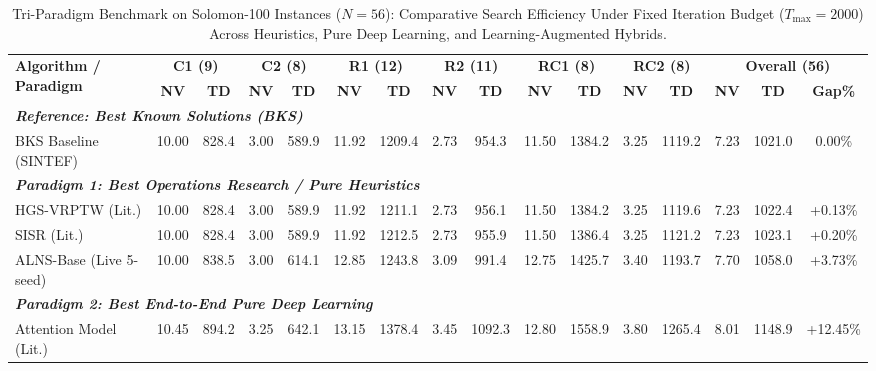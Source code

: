 \documentclass{ieeeaccess}
\begin{document}
\begin{table}[!t]
\caption{Tri-Paradigm Benchmark on Solomon-100 Instances ($N=56$): Comparative Search Efficiency Under Fixed Iteration Budget ($T_{\max}=2000$) Across Heuristics, Pure Deep Learning, and Learning-Augmented Hybrids.}
\label{tab:solomon_tri_paradigm}
\centering
\footnotesize
\setlength{\tabcolsep}{1.7pt}
\begin{tabular*}{\textwidth}{@{\extracolsep{\fill}} l cc cc cc cc cc cc ccc @{}}
\toprule
\multirow{2}{*}{\textbf{Algorithm / Paradigm}} & \multicolumn{2}{c}{\textbf{C1 (9)}} & \multicolumn{2}{c}{\textbf{C2 (8)}} & \multicolumn{2}{c}{\textbf{R1 (12)}} & \multicolumn{2}{c}{\textbf{R2 (11)}} & \multicolumn{2}{c}{\textbf{RC1 (8)}} & \multicolumn{2}{c}{\textbf{RC2 (8)}} & \multicolumn{3}{c}{\textbf{Overall (56)}} \\
\cmidrule(lr){2-3} \cmidrule(lr){4-5} \cmidrule(lr){6-7} \cmidrule(lr){8-9} \cmidrule(lr){10-11} \cmidrule(lr){12-13} \cmidrule(lr){14-16}
 & \textbf{NV} & \textbf{TD} & \textbf{NV} & \textbf{TD} & \textbf{NV} & \textbf{TD} & \textbf{NV} & \textbf{TD} & \textbf{NV} & \textbf{TD} & \textbf{NV} & \textbf{TD} & \textbf{NV} & \textbf{TD} & \textbf{Gap\%} \\
\midrule
\multicolumn{16}{l}{\textit{\textbf{Reference: Best Known Solutions (BKS)}}} \\
BKS Baseline (SINTEF) & 10.00 & 828.4 & 3.00 & 589.9 & 11.92 & 1209.4 & 2.73 & 954.3 & 11.50 & 1384.2 & 3.25 & 1119.2 & 7.23 & 1021.0 & 0.00\% \\
\midrule
\multicolumn{16}{l}{\textit{\textbf{Paradigm 1: Best Operations Research / Pure Heuristics}}} \\
HGS-VRPTW \cite{vidal2013hybrid} (Lit.) & 10.00 & 828.4 & 3.00 & 589.9 & 11.92 & 1211.1 & 2.73 & 956.1 & 11.50 & 1384.2 & 3.25 & 1119.6 & 7.23 & 1022.4 & +0.13\% \\
SISR \cite{christiaens2020slack} (Lit.) & 10.00 & 828.4 & 3.00 & 589.9 & 11.92 & 1212.5 & 2.73 & 955.9 & 11.50 & 1386.4 & 3.25 & 1121.2 & 7.23 & 1023.1 & +0.20\% \\
ALNS-Base \cite{pisinger2007general} (Live 5-seed) & 10.00 & 838.5 & 3.00 & 614.1 & 12.85 & 1243.8 & 3.09 & 991.4 & 12.75 & 1425.7 & 3.40 & 1193.7 & 7.70 & 1058.0 & +3.73\% \\
\midrule
\multicolumn{16}{l}{\textit{\textbf{Paradigm 2: Best End-to-End Pure Deep Learning}}} \\
Attention Model \cite{kool2019attention,lin2021neural} (Lit.) & 10.45 & 894.2 & 3.25 & 642.1 & 13.15 & 1378.4 & 3.45 & 1092.3 & 12.80 & 1558.9 & 3.80 & 1265.4 & 8.01 & 1148.9 & +12.45\% \\

\end{tabular*}
\end{table}
\end{document}
